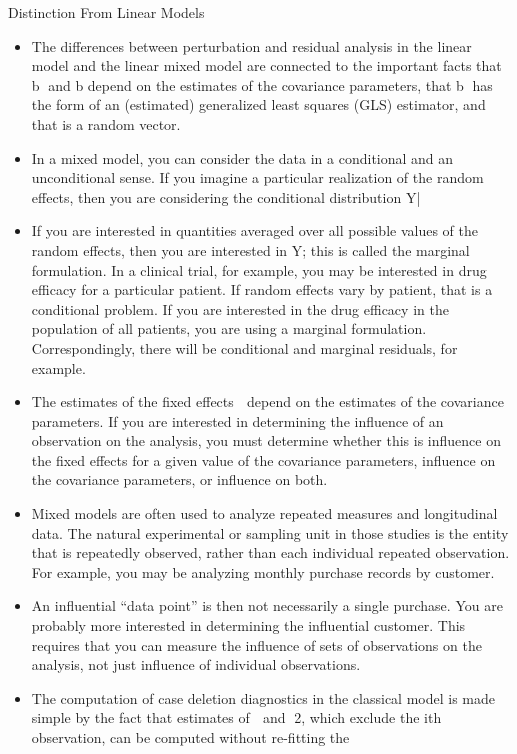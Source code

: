 \documentclass[]{article}
\begin{document}
\newpage
Distinction From Linear Models
\begin{itemize}
\item The differences between perturbation and residual analysis in the linear model and the linear mixed model
are connected to the important facts that b and b
 depend on the estimates of the covariance parameters,
that b has the form of an (estimated) generalized least squares (GLS) estimator, and that 
 is a random
vector.
\item In a mixed model, you can consider the data in a conditional and an unconditional sense. If you imagine
a particular realization of the random effects, then you are considering the conditional distribution
Y|
\item If you are interested in quantities averaged over all possible values of the random effects, then
you are interested in Y; this is called the marginal formulation. In a clinical trial, for example, you
may be interested in drug efficacy for a particular patient. If random effects vary by patient, that is a
conditional problem. If you are interested in the drug efficacy in the population of all patients, you are
using a marginal formulation. Correspondingly, there will be conditional and marginal residuals, for
example.
\item The estimates of the fixed effects  depend on the estimates of the covariance parameters. If you are
interested in determining the influence of an observation on the analysis, you must determine whether
this is influence on the fixed effects for a given value of the covariance parameters, influence on the
covariance parameters, or influence on both.
\item Mixed models are often used to analyze repeated measures and longitudinal data. The natural experimental
or sampling unit in those studies is the entity that is repeatedly observed, rather than each
individual repeated observation. For example, you may be analyzing monthly purchase records by
customer. 
\item An influential “data point” is then not necessarily a single purchase. You are probably more
interested in determining the influential customer. This requires that you can measure the influence
of sets of observations on the analysis, not just influence of individual observations.
\item The computation of case deletion diagnostics in the classical model is made simple by the fact that
estimates of  and 2, which exclude the ith observation, can be computed without re-fitting the

\end{itemize}
\end{document}
